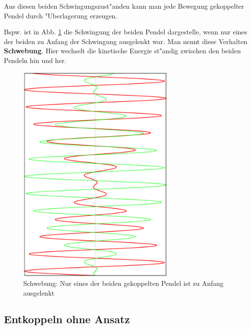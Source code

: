 \begin{Wichtig}
   Aus diesen beiden Schwingungszust"anden kann man jede Bewegung
   gekoppelter Pendel durch "Uberlagerung erzeugen.
\end{Wichtig}
Bspw. ist in Abb. \ref{abb_schwebung} die Schwingung der beiden Pendel
dargestelle, wenn nur eines der beiden zu Anfang der Schwingung
ausgelenkt war. Man nennt diese Verhalten
\textbf{Schwebung}. Hier wechselt die kinetische
Energie st"andig zwischen den beiden Pendeln hin und her.

\begin{figure}
   \centering
   \includegraphics[width=0.7\textwidth,angle=-90]{bilder/schwebung}
   \caption[Schwebung]{Schwebung: Nur eines der beiden gekoppelten
     Pendel ist zu Anfang ausgelenkt}
   \label{abb_schwebung}
\end{figure}




\subsection{Entkoppeln ohne Ansatz}
\label{kap_entkoppeln-ohne-ansatz}

